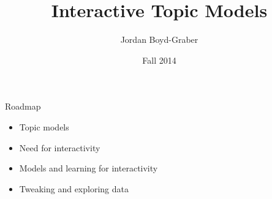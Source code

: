 \documentclass[compress]{beamer}
\title{Interactive Topic Models}
\author{Jordan Boyd-Graber}
\date{Fall 2014}
\begin{document}

\frame{\titlepage}


\begin{frame}{Roadmap}

	\begin{itemize}
		\item Topic models
		\item Need for interactivity
		\item Models and learning for interactivity
		\item Tweaking and exploring data
	\end{itemize}

\end{frame}


\begin{frame}


\end{frame}
\end{document}
